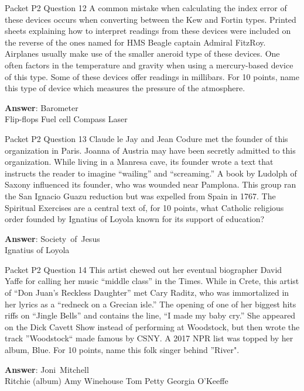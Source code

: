 \begin{frame}{Packet P2 Question 12}
A common mistake when calculating the index error of these devices occurs when converting between the Kew and Fortin types. Printed sheets explaining how to interpret readings from these devices were included on the reverse of the ones named for HMS Beagle captain Admiral FitzRoy. Airplanes usually make use of the smaller aneroid type of these devices. One often factors in the temperature and gravity when using a mercury-based device of this type. Some of these devices offer readings in millibars. For 10 points, name this type of device which measures the pressure of the atmosphere.        

\textbf{Answer}: Barometer\\
 Flip-flops
 Fuel cell
 Compass
 Laser
\end{frame}

\begin{frame}{Packet P2 Question 13}
Claude le Jay and Jean Codure met the founder of this organization in Paris. Joanna of Austria may have been secretly admitted to this organization. While living in a Manresa cave, its founder wrote a text that instructs the reader to imagine ``wailing'' and ``screaming.'' A book by Ludolph of Saxony influenced   its founder, who was wounded near Pamplona. This group   ran the San Ignacio Guazu reduction but was expelled from Spain in 1767. The Spiritual Exercises are a central text of, for 10 points, what Catholic religious order founded by Ignatius   of Loyola known     for its support of education?

\textbf{Answer}: Society\ of\ Jesus\\
 Ignatius of Loyola
\end{frame}

\begin{frame}{Packet P2 Question 14}
This artist chewed out her eventual biographer David Yaffe for calling her music “middle class” in the Times. While in Crete, this artist of “Don Juan’s Reckless Daughter” met Cary Raditz, who was immortalized in her lyrics as a ``redneck on a Grecian isle.'' The opening of one of her biggest hits riffs on ``Jingle Bells'' and contains the line, ``I made my baby cry.” She appeared on the Dick Cavett Show instead of performing at Woodstock, but then wrote the track ''Woodstock`` made famous by CSNY. A 2017 NPR list was topped by her album, Blue. For 10 points, name this folk singer behind ''River".        

\textbf{Answer}: Joni\ Mitchell\\
 Ritchie (album)
 Amy Winehouse
 Tom Petty
 Georgia O'Keeffe
\end{frame}

